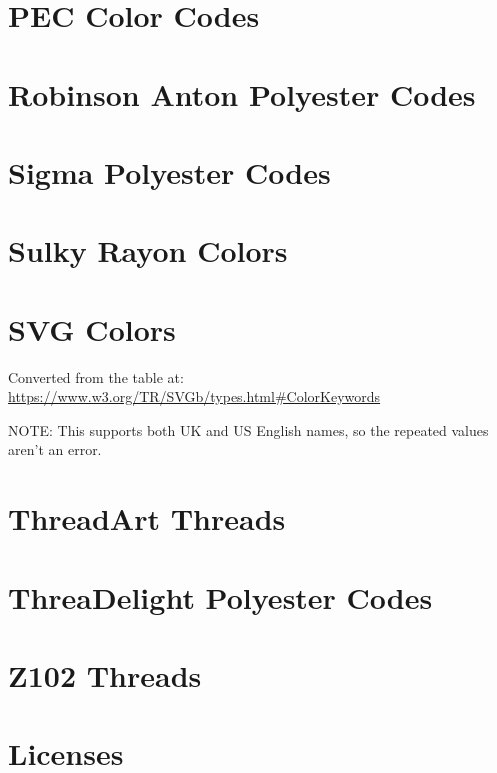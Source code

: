 \documentclass[a4paper]{report}
\begin{document}
%

\section{PEC Color Codes}

%

\section{Robinson Anton Polyester Codes}

% 

\section{Sigma Polyester Codes}

%

\section{Sulky Rayon Colors}

%

\section{SVG Colors}

Converted from the table at:
\url{https://www.w3.org/TR/SVGb/types.html#ColorKeywords}

NOTE: This supports both UK and US English names, so the repeated values aren't
an error.

\section{ThreadArt Threads}

% 

% 

\section{ThreaDelight Polyester Codes}

\section{Z102 Threads}



\section{Licenses}



\printindex
\end{document}
